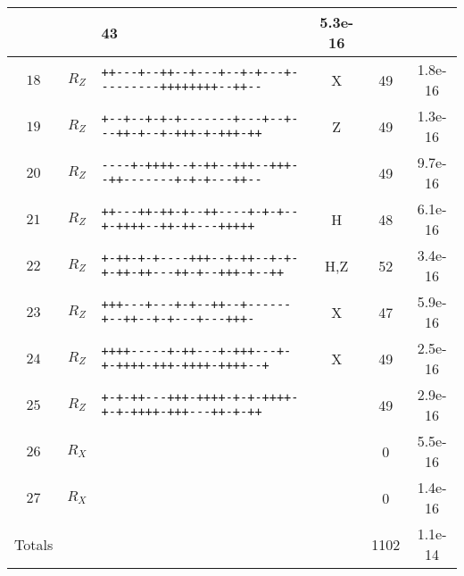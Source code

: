 {\begin{tabular}{|c|c|l|c|c|c|}
        &  
        & 43 
        & 5.3e-16
    \\\hline 
        $18$ 
        & $R_Z$ 
        & \texttt{+{}+{}-{}-{}-{}+{}-{}-{}+{}+{}-{}-{}+{}-{}-{}-{}+{}-{}-{}+{}-{}+{}-{}-{}-{}+{}-{}-{}-{}-{}-{}-{}-{}-{}-{}+{}+{}+{}+{}+{}+{}+{}+{}-{}-{}+{}+{}-{}-} 
        & X 
        & 49 
        & 1.8e-16
    \\\hline 
        $19$ 
        & $R_Z$ 
        & \texttt{+{}-{}-{}+{}-{}-{}+{}-{}+{}-{}+{}-{}-{}-{}-{}-{}-{}-{}+{}-{}-{}-{}+{}-{}-{}+{}-{}-{}-{}+{}+{}-{}+{}-{}-{}+{}-{}+{}+{}+{}-{}+{}-{}+{}+{}+{}-{}+{}+} 
        & Z 
        & 49 
        & 1.3e-16
    \\\hline 
        $20$ 
        & $R_Z$ 
        & \texttt{-{}-{}-{}-{}+{}-{}+{}+{}+{}+{}-{}-{}+{}-{}+{}+{}-{}-{}+{}+{}+{}-{}-{}+{}+{}+{}-{}-{}+{}+{}-{}-{}-{}-{}-{}-{}-{}+{}-{}+{}-{}+{}-{}-{}-{}+{}+{}-{}-} 
        &  
        & 49 
        & 9.7e-16
    \\\hline 
        $21$ 
        & $R_Z$ 
        & \texttt{+{}+{}-{}-{}-{}+{}+{}-{}+{}+{}-{}+{}-{}-{}+{}+{}-{}-{}-{}-{}+{}-{}+{}-{}+{}-{}-{}+{}-{}+{}+{}+{}+{}-{}-{}+{}+{}-{}+{}+{}-{}-{}-{}+{}+{}+{}+{}+} 
        & H 
        & 48 
        & 6.1e-16
    \\\hline 
        $22$ 
        & $R_Z$ 
        & \texttt{+{}-{}+{}+{}-{}+{}-{}+{}-{}-{}-{}-{}+{}+{}+{}-{}-{}+{}-{}+{}+{}-{}-{}+{}-{}+{}-{}+{}-{}+{}+{}-{}+{}+{}-{}-{}-{}+{}+{}-{}+{}-{}-{}+{}+{}+{}-{}+{}-{}-{}+{}+} 
        & H,Z 
        & 52 
        & 3.4e-16
    \\\hline 
        $23$ 
        & $R_Z$ 
        & \texttt{+{}+{}+{}-{}-{}-{}+{}-{}-{}-{}+{}-{}+{}-{}-{}+{}+{}-{}-{}+{}-{}-{}-{}-{}-{}-{}+{}-{}-{}+{}+{}-{}-{}+{}-{}+{}-{}-{}-{}+{}-{}-{}-{}+{}+{}+{}-} 
        & X 
        & 47 
        & 5.9e-16
    \\\hline 
        $24$ 
        & $R_Z$ 
        & \texttt{+{}+{}+{}+{}-{}-{}-{}-{}-{}+{}-{}+{}+{}-{}-{}-{}+{}-{}+{}+{}+{}-{}-{}-{}+{}-{}+{}-{}+{}+{}+{}+{}-{}+{}+{}+{}-{}+{}+{}+{}+{}-{}+{}+{}+{}+{}-{}-{}+} 
        & X 
        & 49 
        & 2.5e-16
    \\\hline 
        $25$ 
        & $R_Z$ 
        & \texttt{+{}-{}+{}-{}+{}+{}-{}-{}-{}+{}+{}+{}-{}+{}+{}+{}+{}-{}+{}-{}+{}-{}+{}+{}+{}+{}-{}+{}-{}+{}-{}+{}+{}+{}+{}-{}+{}+{}+{}-{}-{}-{}+{}+{}-{}+{}-{}+{}+} 
        &  
        & 49 
        & 2.9e-16
    \\\hline 
        $26$ 
        & $R_X$ 
        & \texttt{} 
        &  
        & 0 
        & 5.5e-16
    \\\hline 
        $27$ 
        & $R_X$ 
        & \texttt{} 
        &  
        & 0 
        & 1.4e-16
    \\\hline\hline 
        Totals 
        &  
        &  
        &  
        & 1102 
        & 1.1e-14

    \\\hline
    \end{tabular}}




